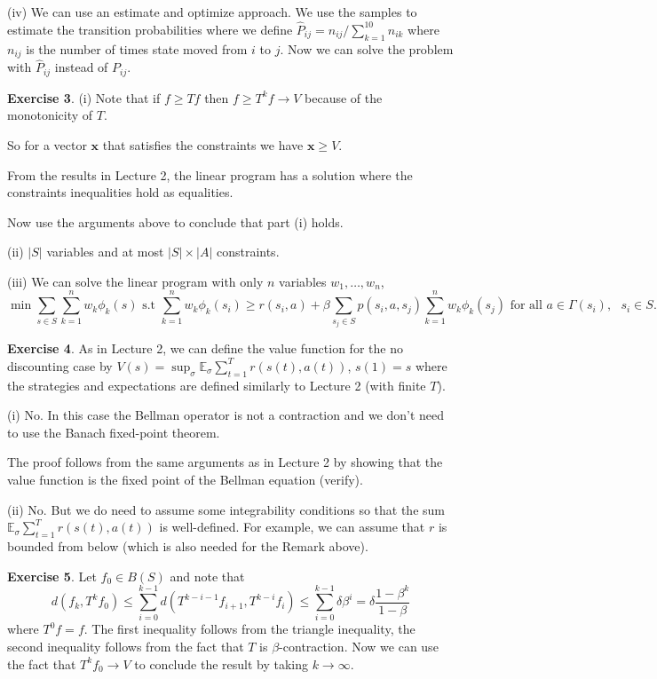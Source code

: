 \documentclass[letter,11pt]{article}
\begin{document}
(iv) We can use an estimate and optimize approach. We use the samples to estimate the transition probabilities where we define $\hat{P}_{ij} = n_{ij}/\sum_{k=1}^{10} n_{ik} $ where $n_{ij}$ is the number of times state moved from $i$ to $j$. Now we can solve the problem with $\hat{P}_{ij}$ instead of $P_{ij}$. 

\textbf{Exercise 3}.
(i) Note that if $f \geq Tf$ then $f \geq T^{k}f \rightarrow V$ because of the monotonicity of $T$.

So  for a vector $\boldsymbol{x}$ that satisfies the constraints we have $\boldsymbol{x} \geq V$. 

 From the results in Lecture 2, the linear program has a solution where the constraints inequalities hold as equalities. 
 
 Now use the arguments above to conclude that part (i) holds.

 (ii) $|S|$ variables and at most $|S| \times |A|$ constraints.


 (iii) We can solve the linear program with only $n$ variables $w_{1},\ldots,w_{n}$, 
    $$ \min \sum _{s \in S} \sum _{k=1}^{n} w_{k} \phi_{k} (s) \text{  s.t  }  \sum _{k=1}^{n} w_{k} \phi_{k} (s_{i}) \geq r(s_{i},a) + \beta \sum_{s_{j} \in S}p(s_{i},a,s_{j})  \sum _{k=1}^{n} w_{k} \phi_{k} (s_{j}) \text{ for all } a \in \Gamma(s_{i}), \text { } s_{i} \in S. $$





\textbf{Exercise 4}.
As in Lecture 2, we can define the value function for the no discounting case by  $V(s) = \sup _{\sigma} \mathbb{E} _{\sigma} \sum_{t=1}^{T} r(s(t),a(t)) $, $s(1)=s$ where the strategies and expectations are defined similarly to Lecture 2 (with finite $T$). 

(i) No. In this case the Bellman operator is not a contraction and we don't need to use the Banach fixed-point theorem. 


The proof follows from the same arguments as in Lecture 2 by showing that the value function is the fixed point of the Bellman equation (verify). 



(ii) No. But we do need to assume some integrability conditions so that the sum $\mathbb{E} _{\sigma} \sum_{t=1}^{T} r(s(t),a(t)) $ is well-defined.  For example, we can assume that $r$ is bounded from below (which is also needed for the Remark above).  


\textbf{Exercise 5}.
    Let $f_{0} \in B(S)$ and note that $$d(f_{k},T^{k}f_{0}) \leq \sum_{i=0}^{k-1} d(T^{k-i-1}f_{i+1},T^{k-i}f_{i}) \leq \sum _{i=0}^{k-1} \delta \beta ^{i} = \delta \frac{1 - \beta ^{k} } {1 - \beta } $$
    where $T^{0} f = f$. The first inequality follows from the triangle inequality, the second inequality follows from the fact that $T$ is $\beta$-contraction. Now we can use the fact that $T^{k} f_{0} \rightarrow V$ to conclude the result by taking $k \rightarrow \infty$. 
\end{document}
